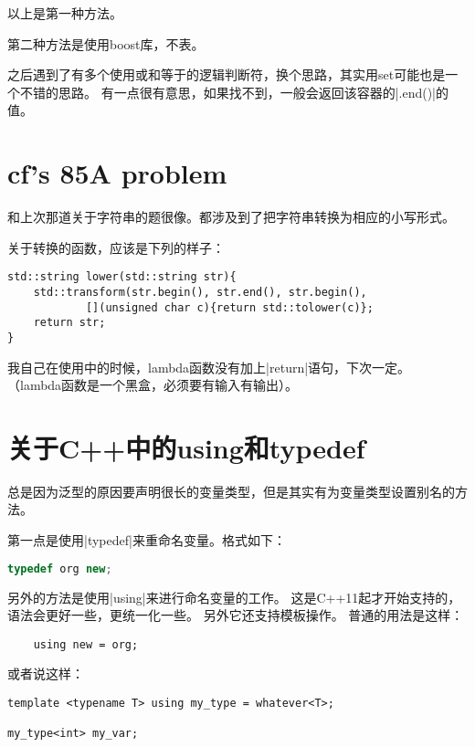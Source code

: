 以上是第一种方法。

第二种方法是使用boost库，不表。

之后遇到了有多个使用或和等于的逻辑判断符，换个思路，其实用set可能也是一个不错的思路。
有一点很有意思，如果找不到，一般会返回该容器的\vb|.end()|的值。



\section{cf's 85A problem}

和上次那道关于字符串的题很像。都涉及到了把字符串转换为相应的小写形式。

关于转换的函数，应该是下列的样子：

\begin{lstlisting}
std::string lower(std::string str){
    std::transform(str.begin(), str.end(), str.begin(),
            [](unsigned char c){return std::tolower(c)};
    return str;
}
\end{lstlisting}

我自己在使用中的时候，lambda函数没有加上\vb|return|语句，下次一定。
（lambda函数是一个黑盒，必须要有输入有输出）。


\section{关于C++中的using和typedef}

总是因为泛型的原因要声明很长的变量类型，但是其实有为变量类型设置别名的方法。

第一点是使用\vb|typedef|来重命名变量。格式如下：

\begin{lstlisting}[language=C++]
    typedef org new;
\end{lstlisting}

另外的方法是使用\vb|using|来进行命名变量的工作。
这是C++11起才开始支持的，语法会更好一些，更统一化一些。
另外它还支持模板操作。
普通的用法是这样：

\begin{lstlisting}
    using new = org;
\end{lstlisting}

或者说这样：

\begin{lstlisting}
template <typename T> using my_type = whatever<T>;

my_type<int> my_var;
\end{lstlisting}

